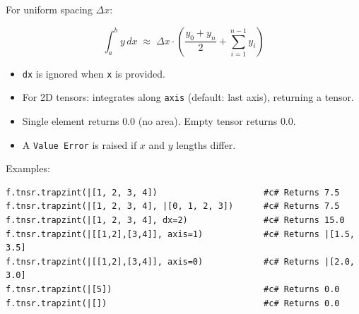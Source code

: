 For uniform spacing $\Delta x$:

\begin{equation}
\int_a^b y \, dx \;\approx\; \Delta x \cdot \left( \frac{y_0 + y_n}{2} + \sum_{i=1}^{n-1} y_i \right)
\label{eq:trapz-uniform}
\end{equation}

\begin{itemize}
\item \texttt{dx} is ignored when \texttt{x} is provided.
\item For 2D tensors: integrates along \texttt{axis} (default: last axis), returning a tensor.
\item Single element returns $0.0$ (no area). Empty tensor returns $0.0$.
\item A \texttt{Value Error} is raised if $x$ and $y$ lengths differ.
\end{itemize}
Examples:
\begin{verbatim}
f.tnsr.trapzint(|[1, 2, 3, 4])                     #c# Returns 7.5
f.tnsr.trapzint(|[1, 2, 3, 4], |[0, 1, 2, 3])      #c# Returns 7.5
f.tnsr.trapzint(|[1, 2, 3, 4], dx=2)               #c# Returns 15.0
f.tnsr.trapzint(|[[1,2],[3,4]], axis=1)            #c# Returns |[1.5, 3.5]
f.tnsr.trapzint(|[[1,2],[3,4]], axis=0)            #c# Returns |[2.0, 3.0]
f.tnsr.trapzint(|[5])                              #c# Returns 0.0
f.tnsr.trapzint(|[])                               #c# Returns 0.0
\end{verbatim}

